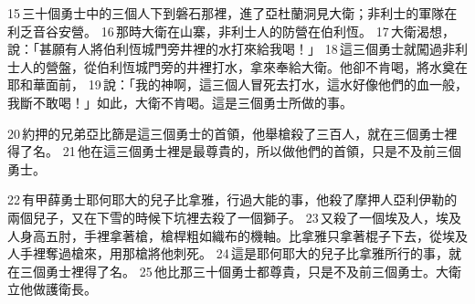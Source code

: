 15 三十個勇士中的三個人下到磐石那裡，進了亞杜蘭洞見大衛；非利士的軍隊在利乏音谷安營。 16 那時大衛在山寨，非利士人的防營在伯利恆。 17 大衛渴想，說：「甚願有人將伯利恆城門旁井裡的水打來給我喝！」 18 這三個勇士就闖過非利士人的營盤，從伯利恆城門旁的井裡打水，拿來奉給大衛。他卻不肯喝，將水奠在耶和華面前， 19 說：「我的神啊，這三個人冒死去打水，這水好像他們的血一般，我斷不敢喝！」如此，大衛不肯喝。這是三個勇士所做的事。

20 約押的兄弟亞比篩是這三個勇士的首領，他舉槍殺了三百人，就在三個勇士裡得了名。 21 他在這三個勇士裡是最尊貴的，所以做他們的首領，只是不及前三個勇士。

22 有甲薛勇士耶何耶大的兒子比拿雅，行過大能的事，他殺了摩押人亞利伊勒的兩個兒子，又在下雪的時候下坑裡去殺了一個獅子。 23 又殺了一個埃及人，埃及人身高五肘，手裡拿著槍，槍桿粗如織布的機軸。比拿雅只拿著棍子下去，從埃及人手裡奪過槍來，用那槍將他刺死。 24 這是耶何耶大的兒子比拿雅所行的事，就在三個勇士裡得了名。 25 他比那三十個勇士都尊貴，只是不及前三個勇士。大衛立他做護衛長。


